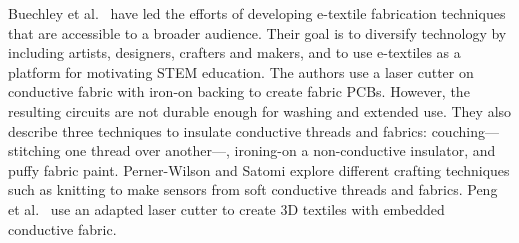 Buechley et al.\ \cite{Buechley2009} have led the efforts of developing e-textile fabrication techniques that are accessible to a broader audience. Their goal is to diversify technology by including artists, designers, crafters and makers, and to use e-textiles as a platform for motivating STEM education. The authors use a laser cutter on conductive fabric with iron-on backing to create fabric PCBs. However, the resulting circuits are not durable enough for washing and extended use. They also describe three techniques to insulate conductive threads and fabrics: couching---stitching one thread over another---, ironing-on a non-conductive insulator, and puffy fabric paint. Perner-Wilson and Satomi \cite{perner2011handcrafting} explore different crafting techniques such as knitting to make sensors from soft conductive threads and fabrics. Peng et al.\  \cite{peng2015layered} use an adapted laser cutter to create 3D textiles with embedded conductive fabric.





